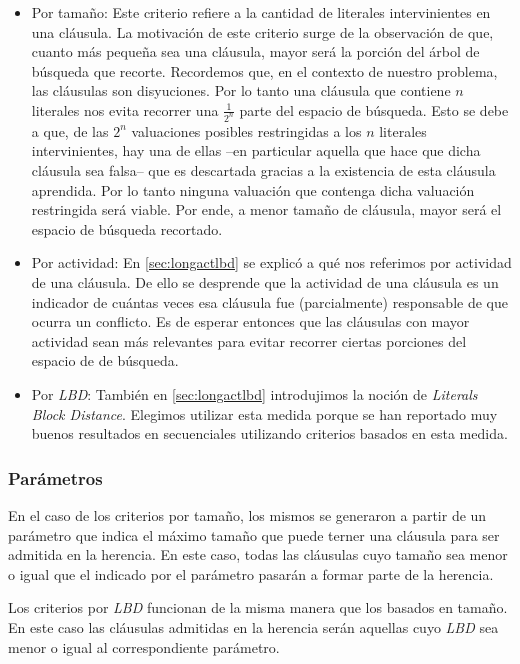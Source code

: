 \begin{itemize}
	\item Por tamaño: Este criterio refiere a la cantidad de literales intervinientes en una cláusula. La motivación de este criterio surge de la observación de que, cuanto más pequeña sea una cláusula, mayor será la porción del árbol de búsqueda que recorte. Recordemos que, en el contexto de nuestro problema, las cláusulas son disyuciones. Por lo tanto una cláusula que contiene $n$ literales nos evita recorrer una $\frac{1}{2^n}$ parte del espacio de búsqueda. Esto se debe a que, de las $2^n$ valuaciones posibles restringidas a los $n$ literales intervinientes, hay una de ellas --en particular aquella que hace que dicha cláusula sea falsa-- que es descartada gracias a la existencia de esta cláusula aprendida. Por lo tanto ninguna valuación que contenga dicha valuación restringida será viable. Por ende, a menor tamaño de cláusula, mayor será el espacio de búsqueda recortado.

	\item Por actividad: En \ref{sec:longactlbd} se explicó a qué nos referimos por actividad de una cláusula. De ello se desprende que la actividad de una cláusula es un indicador de cuántas veces esa cláusula fue (parcialmente) responsable de que ocurra un conflicto. Es de esperar entonces que las cláusulas con mayor actividad sean más relevantes para evitar recorrer ciertas porciones del espacio de de búsqueda.

	\item Por \emph{LBD}: También en \ref{sec:longactlbd} introdujimos la noción de \emph{Literals Block Distance}. Elegimos utilizar esta medida porque se han reportado muy buenos resultados en \ssolvers secuenciales \cite{satchallenge12,satcomp11,satcomp09} utilizando criterios basados en esta medida.
\end{itemize}

\subsubsection{Parámetros}

En el caso de los criterios por tamaño, los mismos se generaron a partir de un
parámetro que indica el máximo tamaño que puede terner una cláusula para ser
admitida en la herencia. En este caso, todas las cláusulas cuyo tamaño sea
menor o igual que el indicado por el parámetro pasarán a formar parte de la
herencia.

Los criterios por \emph{LBD} funcionan de la misma manera que los basados en
tamaño. En este caso las cláusulas admitidas en la herencia serán aquellas
cuyo \emph{LBD} sea menor o igual al correspondiente parámetro.

